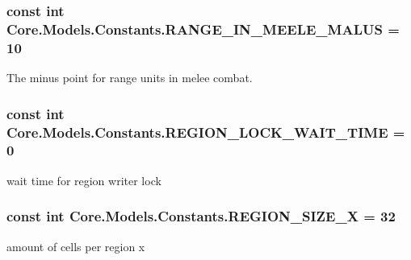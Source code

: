\subsubsection[{R\+A\+N\+G\+E\+\_\+\+I\+N\+\_\+\+M\+E\+E\+L\+E\+\_\+\+M\+A\+L\+U\+S}]{\setlength{\rightskip}{0pt plus 5cm}const int Core.\+Models.\+Constants.\+R\+A\+N\+G\+E\+\_\+\+I\+N\+\_\+\+M\+E\+E\+L\+E\+\_\+\+M\+A\+L\+U\+S = 10}\label{classCore_1_1Models_1_1Constants_a3132eb59e27938a80a4ca4d047f4912f}


The minus point for range units in melee combat. 

\hypertarget{classCore_1_1Models_1_1Constants_ae34c70369e0c6c6f34f5b5275625afdb}{}
\subsubsection[{R\+E\+G\+I\+O\+N\+\_\+\+L\+O\+C\+K\+\_\+\+W\+A\+I\+T\+\_\+\+T\+I\+M\+E}]{\setlength{\rightskip}{0pt plus 5cm}const int Core.\+Models.\+Constants.\+R\+E\+G\+I\+O\+N\+\_\+\+L\+O\+C\+K\+\_\+\+W\+A\+I\+T\+\_\+\+T\+I\+M\+E = 0}\label{classCore_1_1Models_1_1Constants_ae34c70369e0c6c6f34f5b5275625afdb}


wait time for region writer lock 

\hypertarget{classCore_1_1Models_1_1Constants_a2d02174b6a70404c1d8093c81eb47cb2}{}
\subsubsection[{R\+E\+G\+I\+O\+N\+\_\+\+S\+I\+Z\+E\+\_\+\+X}]{\setlength{\rightskip}{0pt plus 5cm}const int Core.\+Models.\+Constants.\+R\+E\+G\+I\+O\+N\+\_\+\+S\+I\+Z\+E\+\_\+\+X = 32}\label{classCore_1_1Models_1_1Constants_a2d02174b6a70404c1d8093c81eb47cb2}


amount of cells per region x 


